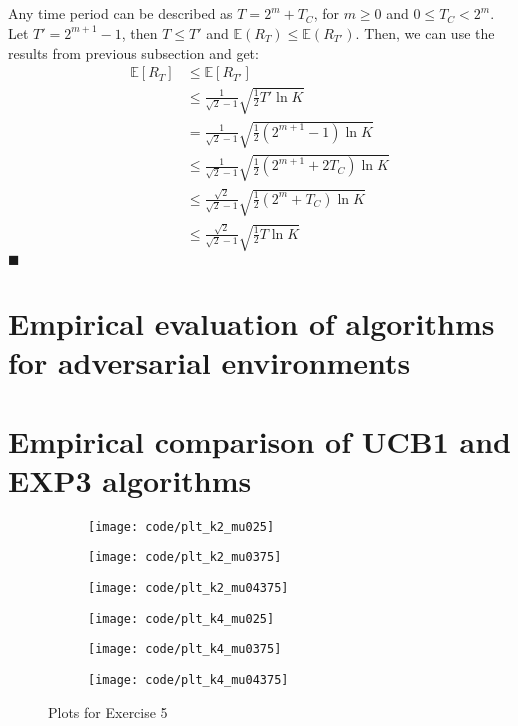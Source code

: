 \documentclass[a4paper]{article}
\newcommand{\expect}[1]{\mathbb{E}\left(#1\right)}
\newcommand*{\QEDA}{\hfill\ensuremath{\blacksquare}}%
\begin{document}
\subsection{}
\label{subsec:32}
Any time period can be described as $T = 2^m + T_C$, for $m\geq0$ and
$0 \leq T_C < 2^m$. Let $T' = 2^{m+1}-1$, then $T \leq T'$ and
$\expect{R_T} \leq \expect{R_{T'}}$.
Then, we can use the results from previous subsection and get:
\begin{align*}
  \mathbb{E}\left[R_{T}\right]&\leq \mathbb{E}\left[R_{T'}\right]\\
  &\leq\frac{1}{\sqrt{2}-1} \sqrt{\frac{1}{2} T' \ln K}\\
  &= \frac{1}{\sqrt{2}-1} \sqrt{\frac{1}{2} (2^{m+1}-1) \ln K}\\
  &\leq\frac{1}{\sqrt{2}-1} \sqrt{\frac{1}{2} (2^{m+1}+2T_C) \ln K} \tag{since $T_C \geq0$}\\
  &\leq\frac{\sqrt{2}}{\sqrt{2}-1} \sqrt{\frac{1}{2} (2^m+T_C) \ln K}\\
  &\leq\frac{\sqrt{2}}{\sqrt{2}-1} \sqrt{\frac{1}{2} T \ln K}
\end{align*}
\QEDA
\section{Empirical evaluation of algorithms for adversarial environments}
\label{sec:4}

\section{Empirical comparison of UCB1 and EXP3 algorithms}
\label{sec:5}
\begin{figure}
  \centering
  \begin{subfigure}[b]{0.49\textwidth}
    \centering
    \texttt{[image: code/plt\_k2\_mu025]}
  \end{subfigure}
  \begin{subfigure}[b]{0.49\textwidth}
    \centering
    \texttt{[image: code/plt\_k2\_mu0375]}
  \end{subfigure}
  \begin{subfigure}[b]{0.49\textwidth}
    \centering
    \texttt{[image: code/plt\_k2\_mu04375]}
  \end{subfigure}
  \begin{subfigure}[b]{0.49\textwidth}
    \centering
    \texttt{[image: code/plt\_k4\_mu025]}
  \end{subfigure}
  \begin{subfigure}[b]{0.49\textwidth}
    \centering
    \texttt{[image: code/plt\_k4\_mu0375]}
  \end{subfigure}
  \begin{subfigure}[b]{0.49\textwidth}
    \centering
    \texttt{[image: code/plt\_k4\_mu04375]}
  \end{subfigure}
  \caption{Plots for Exercise 5}
  \label{plt5}
\end{figure}
\end{document}
